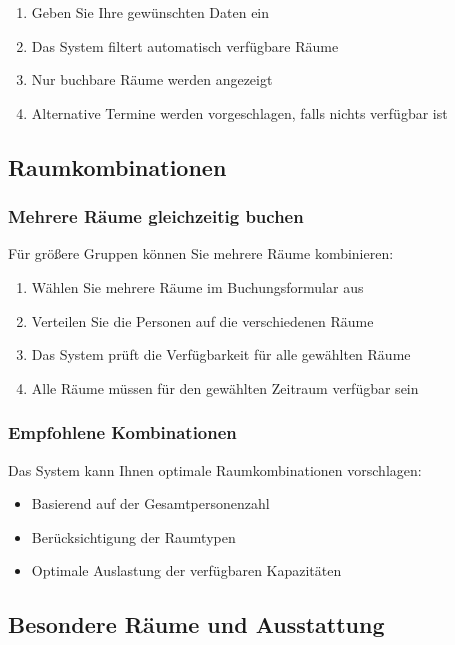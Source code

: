 \begin{enumerate}
    \item Geben Sie Ihre gewünschten Daten ein
    \item Das System filtert automatisch verfügbare Räume
    \item Nur buchbare Räume werden angezeigt
    \item Alternative Termine werden vorgeschlagen, falls nichts verfügbar ist
\end{enumerate}

\subsection{Raumkombinationen}

\subsubsection{Mehrere Räume gleichzeitig buchen}

Für größere Gruppen können Sie mehrere Räume kombinieren:

\begin{enumerate}
    \item Wählen Sie mehrere Räume im Buchungsformular aus
    \item Verteilen Sie die Personen auf die verschiedenen Räume
    \item Das System prüft die Verfügbarkeit für alle gewählten Räume
    \item Alle Räume müssen für den gewählten Zeitraum verfügbar sein
\end{enumerate}

\subsubsection{Empfohlene Kombinationen}

Das System kann Ihnen optimale Raumkombinationen vorschlagen:

\begin{itemize}
    \item Basierend auf der Gesamtpersonenzahl
    \item Berücksichtigung der Raumtypen
    \item Optimale Auslastung der verfügbaren Kapazitäten
\end{itemize}

\subsection{Besondere Räume und Ausstattung}

